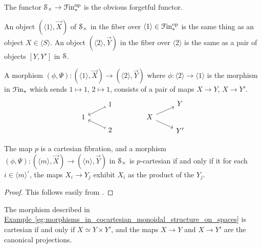 \documentclass[main.tex]{subfiles}
\begin{document}
The functor $\S_{\times} \to \Finp\op$ is the obvious forgetful functor.

\begin{example}
  \label{eg:morphisms_in_cocartesian_monoidal_structure_on_spaces}
  An object $(\langle 1 \rangle, \vec{X})$ of $\S_{\times}$ in the fiber over $\langle 1 \rangle \in \Finp\op$ is the same thing as an object $X \in \langle S \rangle$. An object $( \langle 2 \rangle, \vec{Y})$ in the fiber over $\langle 2 \rangle$ is the same as a pair of objects $[Y, Y']$ in $\S$.

  A morphism $(\phi, \Psi)\colon (\langle 1 \rangle, \vec{X}) \to (\langle 2 \rangle, \vec{Y})$ where $\phi\colon \langle 2 \rangle \to \langle 1 \rangle$ is the morphism in $\Finp$ which sends $1 \mapsto 1$, $2 \mapsto 1$, consists of a pair of maps $X \to Y$, $X \to Y'$.
  \begin{equation*}
    \begin{tikzcd}[row sep=tiny]
      & 1
      \arrow[dl, mapsto]
      \\
      1
      \\
      & 2
      \arrow[ul, mapsto]
    \end{tikzcd}
    \qquad\qquad
    \begin{tikzcd}[row sep=tiny]
      & Y
      \\
      X
      \arrow[ur]
      \arrow[dr]
      \\
      & Y'
    \end{tikzcd}
  \end{equation*}
\end{example}

\begin{lemma}
  The map $p$ is a cartesian fibration, and a morphism $(\phi, \Psi)\colon (\langle m \rangle, \vec{X}) \to (\langle n \rangle, \vec{Y})$ in $\S_{\times}$ is $p$-cartesian if and only if it for each $i \in \langle m \rangle^{\circ}$, the maps $X_{i} \to Y_{j}$ exhibit $X_{i}$ as the product of the $Y_{j}$.
\end{lemma}
\begin{proof}
  This follows easily from \cite[Rem.~2.4.3.4]{luriehigheralgebra}.
\end{proof}

\begin{example}
  The morphism described in \hyperref[eg:morphisms_in_cocartesian_monoidal_structure_on_spaces]{Example~\ref*{eg:morphisms_in_cocartesian_monoidal_structure_on_spaces}} is cartesian if and only if $X \simeq Y \times Y'$, and the maps $X \to Y$ and $X \to Y'$ are the canonical projections.
\end{example}
\end{document}
